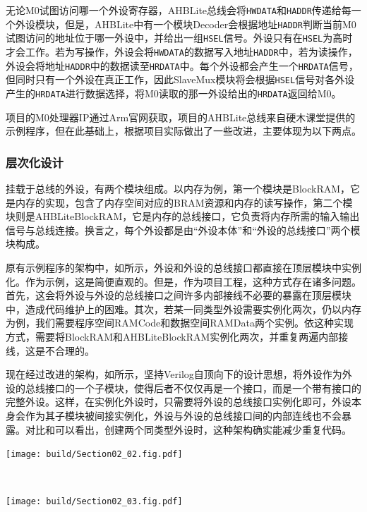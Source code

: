 无论M0试图访问哪一个外设寄存器，AHBLite总线会将\texttt{HWDATA}和\texttt{HADDR}传递给每一个外设模块，但是，AHBLite中有一个模块Decoder会根据地址\texttt{HADDR}判断当前M0试图访问的地址位于哪一外设中，并给出一组\texttt{HSEL}信号。外设只有在\texttt{HSEL}为高时才会工作。若为写操作，外设会将\texttt{HWDATA}的数据写入地址\texttt{HADDR}中，若为读操作，外设会将地址\texttt{HADDR}中的数据读至\texttt{HRDATA}中。每个外设都会产生一个\texttt{HRDATA}信号，但同时只有一个外设在真正工作，因此SlaveMux模块将会根据\texttt{HSEL}信号对各外设产生的\texttt{HRDATA}进行数据选择，将M0读取的那一外设给出的\texttt{HRDATA}返回给M0。

项目的M0处理器IP通过Arm官网获取，项目的AHBLite总线来自硬木课堂提供的示例程序，但在此基础上，根据项目实际做出了一些改进，主要体现为以下两点。

\subsubsection{层次化设计}
挂载于总线的外设，有两个模块组成。以内存为例，第一个模块是BlockRAM，它是内存的实现，包含了内存空间对应的BRAM资源和内存的读写操作，第二个模块则是AHBLiteBlockRAM，它是内存的总线接口，它负责将内存所需的输入输出信号与总线连接。换言之，每个外设都是由“外设本体”和“外设的总线接口”两个模块构成。

原有示例程序的架构中，如所示，外设和外设的总线接口都直接在顶层模块中实例化。作为示例，这是简便直观的。但是，作为项目工程，这种方式存在诸多问题。首先，这会将外设与外设的总线接口之间许多内部接线不必要的暴露在顶层模块中，造成代码维护上的困难。其次，若某一同类型外设需要实例化两次，仍以内存为例，我们需要程序空间RAMCode和数据空间RAMData两个实例。依这种实现方式，需要将BlockRAM和AHBLiteBlockRAM实例化两次，并重复两遍内部接线，这是不合理的。

现在经过改进的架构，如所示，坚持Verilog自顶向下的设计思想，将外设作为外设的总线接口的一个子模块，使得后者不仅仅再是一个接口，而是一个带有接口的完整外设。这样，在实例化外设时，只需要将外设的总线接口实例化即可，外设本身会作为其子模块被间接实例化，外设与外设的总线接口间的内部连线也不会暴露。对比和可以看出，创建两个同类型外设时，这种架构确实能减少重复代码。


\begin{Figure}[层次化设计优化]
    \begin{FigureSub}[原有架构]
        \texttt{[image: build/Section02\_02.fig.pdf]}
    \end{FigureSub}\\ \vspace{0.5cm}
    \begin{FigureSub}[现有架构]
        \texttt{[image: build/Section02\_03.fig.pdf]}
    \end{FigureSub}
\end{Figure}

